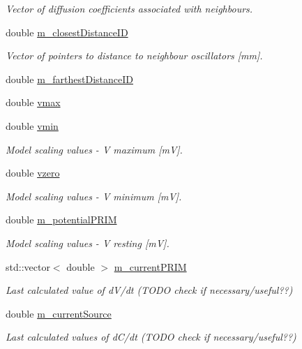 \begin{DoxyCompactItemize}
\begin{DoxyCompactList}\small\item\em Vector of diffusion coefficients associated with neighbours. \end{DoxyCompactList}\item 
double \hyperlink{class_oscillator_a85169bc0fa20530ed7a5e8089b572729}{m\+\_\+closest\+Distance\+I\+D}
\begin{DoxyCompactList}\small\item\em Vector of pointers to distance to neighbour oscillators \mbox{[}mm\mbox{]}. \end{DoxyCompactList}\item 
double \hyperlink{class_oscillator_a216d83f43397708641a00c38d75570d3}{m\+\_\+farthest\+Distance\+I\+D}
\item 
double \hyperlink{class_oscillator_a43006eaf9a5a3b50a8f6a2a95ce47231}{vmax}
\item 
double \hyperlink{class_oscillator_a8912b5faff383dcc1a33554d2bcc5844}{vmin}
\begin{DoxyCompactList}\small\item\em Model scaling values -\/ V maximum \mbox{[}m\+V\mbox{]}. \end{DoxyCompactList}\item 
double \hyperlink{class_oscillator_af6886099dfca8ec732676f4f89935651}{vzero}
\begin{DoxyCompactList}\small\item\em Model scaling values -\/ V minimum \mbox{[}m\+V\mbox{]}. \end{DoxyCompactList}\item 
double \hyperlink{class_oscillator_aedf0974c19ea8428e3702f267cf45465}{m\+\_\+potential\+P\+R\+I\+M}
\begin{DoxyCompactList}\small\item\em Model scaling values -\/ V resting \mbox{[}m\+V\mbox{]}. \end{DoxyCompactList}\item 
std\+::vector$<$ double $>$ \hyperlink{class_oscillator_aef644a4e5faf78fa338a7a5e739f267c}{m\+\_\+current\+P\+R\+I\+M}
\begin{DoxyCompactList}\small\item\em Last calculated value of d\+V/dt (T\+O\+D\+O check if necessary/useful??) \end{DoxyCompactList}\item 
double \hyperlink{class_oscillator_a766694982f9a1f8ed7013828089587f7}{m\+\_\+current\+Source}
\begin{DoxyCompactList}\small\item\em Last calculated values of d\+C/dt (T\+O\+D\+O check if necessary/useful??) \end{DoxyCompactList}\item 

\end{DoxyCompactItemize}
